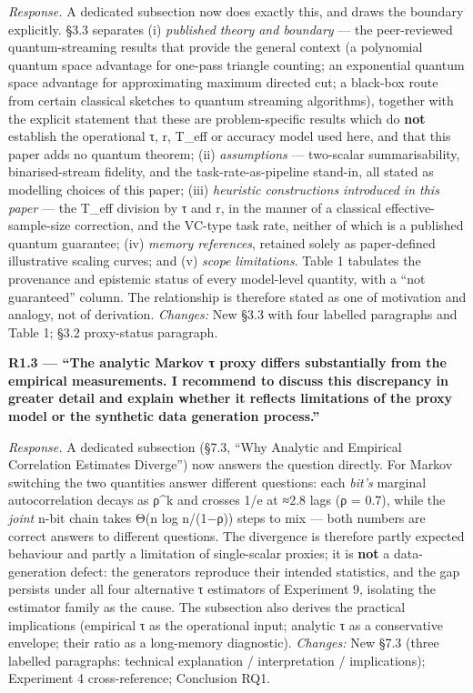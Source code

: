 \documentclass[
  11pt,
]{article}
\begin{document}
\emph{Response.} A dedicated subsection now does exactly this, and draws
the boundary explicitly. §3.3 separates (i) \emph{published theory and
boundary} --- the peer-reviewed quantum-streaming results that provide
the general context (a polynomial quantum space advantage for one-pass
triangle counting; an exponential quantum space advantage for
approximating maximum directed cut; a black-box route from certain
classical sketches to quantum streaming algorithms), together with the
explicit statement that these are problem-specific results which do
\textbf{not} establish the operational τ, r, T\_eff or accuracy model
used here, and that this paper adds no quantum theorem; (ii)
\emph{assumptions} --- two-scalar summarisability, binarised-stream
fidelity, and the task-rate-as-pipeline stand-in, all stated as
modelling choices of this paper; (iii) \emph{heuristic constructions
introduced in this paper} --- the T\_eff division by τ and r, in the
manner of a classical effective-sample-size correction, and the VC-type
task rate, neither of which is a published quantum guarantee; (iv)
\emph{memory references}, retained solely as paper-defined illustrative
scaling curves; and (v) \emph{scope limitations}. Table 1 tabulates the
provenance and epistemic status of every model-level quantity, with a
``not guaranteed'' column. The relationship is therefore stated as one
of motivation and analogy, not of derivation. \emph{Changes:} New §3.3
with four labelled paragraphs and Table 1; §3.2 proxy-status paragraph.

\textbf{R1.3 --- ``The analytic Markov τ proxy differs substantially
from the empirical measurements. I recommend to discuss this discrepancy
in greater detail and explain whether it reflects limitations of the
proxy model or the synthetic data generation process.''}

\emph{Response.} A dedicated subsection (§7.3, ``Why Analytic and
Empirical Correlation Estimates Diverge'') now answers the question
directly. For Markov switching the two quantities answer different
questions: each \emph{bit's} marginal autocorrelation decays as ρ\^{}k
and crosses 1/e at ≈2.8 lags (ρ = 0.7), while the \emph{joint} n-bit
chain takes Θ(n log n/(1−ρ)) steps to mix --- both numbers are correct
answers to different questions. The divergence is therefore partly
expected behaviour and partly a limitation of single-scalar proxies; it
is \textbf{not} a data-generation defect: the generators reproduce their
intended statistics, and the gap persists under all four alternative τ
estimators of Experiment 9, isolating the estimator family as the cause.
The subsection also derives the practical implications (empirical τ as
the operational input; analytic τ as a conservative envelope; their
ratio as a long-memory diagnostic). \emph{Changes:} New §7.3 (three
labelled paragraphs: technical explanation / interpretation /
implications); Experiment 4 cross-reference; Conclusion RQ1.
\end{document}

